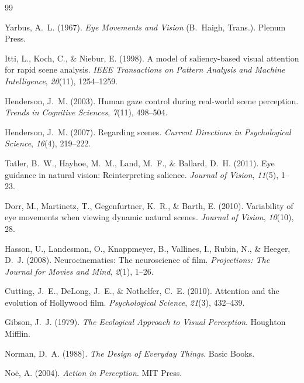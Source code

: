 \documentclass[12pt, a4paper]{article}
\theoremstyle{plain}
\theoremstyle{definition}
\theoremstyle{remark}
\begin{document}
\begin{thebibliography}{99}


Yarbus, A.~L. (1967).
\textit{Eye Movements and Vision}
(B.~Haigh, Trans.).
Plenum Press.

Itti, L., Koch, C., \& Niebur, E. (1998).
A model of saliency-based visual attention for rapid scene
analysis.
\textit{IEEE Transactions on Pattern Analysis and Machine
Intelligence}, \textit{20}(11), 1254--1259.

Henderson, J.~M. (2003).
Human gaze control during real-world scene perception.
\textit{Trends in Cognitive Sciences}, \textit{7}(11),
498--504.

Henderson, J.~M. (2007).
Regarding scenes.
\textit{Current Directions in Psychological Science},
\textit{16}(4), 219--222.

Tatler, B.~W., Hayhoe, M.~M., Land, M.~F., \& Ballard,
D.~H. (2011).
Eye guidance in natural vision: Reinterpreting salience.
\textit{Journal of Vision}, \textit{11}(5), 1--23.

Dorr, M., Martinetz, T., Gegenfurtner, K.~R., \& Barth, E.
(2010).
Variability of eye movements when viewing dynamic natural
scenes.
\textit{Journal of Vision}, \textit{10}(10), 28.

Hasson, U., Landesman, O., Knappmeyer, B., Vallines, I.,
Rubin, N., \& Heeger, D.~J. (2008).
Neurocinematics: The neuroscience of film.
\textit{Projections: The Journal for Movies and Mind},
\textit{2}(1), 1--26.

Cutting, J.~E., DeLong, J.~E., \& Nothelfer, C.~E. (2010).
Attention and the evolution of Hollywood film.
\textit{Psychological Science}, \textit{21}(3), 432--439.


Gibson, J.~J. (1979).
\textit{The Ecological Approach to Visual Perception}.
Houghton Mifflin.

Norman, D.~A. (1988).
\textit{The Design of Everyday Things}.
Basic Books.

No\"{e}, A. (2004).
\textit{Action in Perception}.
MIT Press.


\end{thebibliography}
\end{document}
